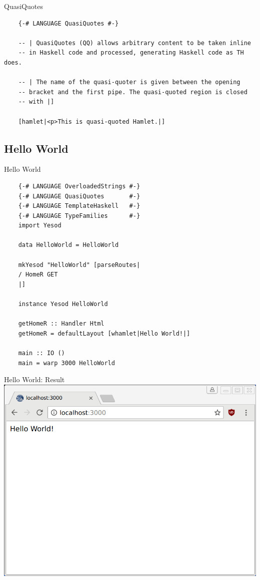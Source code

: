 \documentclass[pdf]{beamer}
\begin{document}
\begin{frame}[fragile]{QuasiQuotes}
  \begin{verbatim}
    {-# LANGUAGE QuasiQuotes #-}
    
    -- | QuasiQuotes (QQ) allows arbitrary content to be taken inline
    -- in Haskell code and processed, generating Haskell code as TH does.

    -- | The name of the quasi-quoter is given between the opening
    -- bracket and the first pipe. The quasi-quoted region is closed
    -- with |]

    [hamlet|<p>This is quasi-quoted Hamlet.|]
  \end{verbatim}
\end{frame}

\subsection{Hello World}
\begin{frame}[fragile]{Hello World}
  \begin{verbatim}
    {-# LANGUAGE OverloadedStrings #-}
    {-# LANGUAGE QuasiQuotes       #-}
    {-# LANGUAGE TemplateHaskell   #-}
    {-# LANGUAGE TypeFamilies      #-}
    import Yesod

    data HelloWorld = HelloWorld

    mkYesod "HelloWorld" [parseRoutes|
    / HomeR GET
    |]

    instance Yesod HelloWorld

    getHomeR :: Handler Html
    getHomeR = defaultLayout [whamlet|Hello World!|]

    main :: IO ()
    main = warp 3000 HelloWorld
  \end{verbatim}
\end{frame}

\begin{frame}{Hello World: Result}
  \includegraphics[width=\textwidth,height=0.8\textheight,keepaspectratio]{example}
\end{frame}
\end{document}
